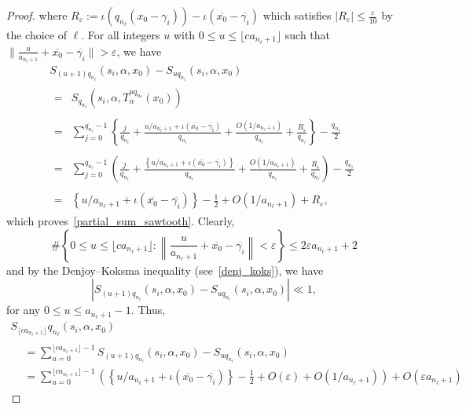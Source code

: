 \documentclass[10pt,a4paper]{amsart}
\numberwithin{equation}{section}
\newcommand{\kj}{n_{\ell}}
\theoremstyle{definition}
\begin{document}
\begin{proof}
where $ R_{\varepsilon} := \iota(q_{\kj}(x_0-\gamma_i)) - \iota(\overline{x_0}-\overline{\gamma_i})$ which satisfies $| R_{\varepsilon} | \leq \frac{\varepsilon}{10}$ by the choice of $\ell$. For all integers $u$ with $0 \leq u \leq \lfloor c a_{\kj +1} \rfloor $ such that $ \| \frac{u}{a_{\kj +1}} + \overline{x_0}-\overline{\gamma_i}\| > \varepsilon$, we have
\begin{multline*}
S_{(u+1)q_{\kj}}(s_i,\alpha,x_0) - S_{uq_{\kj}}(s_i,\alpha,x_0)
\\
\begin{aligned}
=&S_{q_{\kj}}\left(s_i, \alpha, T_{\alpha}^{u q_{\kj}}(x_0)\right) \\
\\=&\sum_{j = 0}^{q_{\kj}-1} \left\{ \frac{j}{q_{\kj}} +\frac{u/a_{\kj+1} + \iota \left(\overline{x_0} - \overline{\gamma_i}\right)}{q_{\kj}} + \frac{O(1/a_{\kj+1})}{q_{\kj}} + \frac{R_\varepsilon}{q_{\kj}}\right\} - \frac{q_{\kj}}{2} \\
\\=&\sum_{j = 0}^{q_{\kj}-1} \left(\frac{j}{q_{\kj}} +\frac{ \left \{u/a_{\kj+1} + \iota \left(\overline{x_0}- \overline{\gamma_i}\right) \right \}}{q_{\kj}} + \frac{O(1/a_{\kj+1})}{q_{\kj}} + \frac{R_\varepsilon}{q_{\kj}} \right) - \frac{q_{\kj}}{2}\\
\\=&\left\{u/a_{\kj+1} + \iota(\overline{x_0}- \overline{\gamma_i}) \right\} - \frac{1}{2} + O(1/a_{\kj+1}) + R_{\varepsilon},
\end{aligned}
\end{multline*}
which proves~\eqref{partial_sum_sawtooth}. Clearly,
\[
\#\left\{ 0 \leq u \leq \lfloor c a_{\kj+1}\rfloor:
\left\|\frac{u}{a_{\kj +1}} + \overline{x_0}- \overline{\gamma_i}\right\| < \varepsilon
\right\} \leq 2\varepsilon a_{\kj+1} + 2
\]
and by the Denjoy--Koksma inequality (see~\eqref{denj_koks}), we have
\[
| S_{(u+1)q_{\kj}}(s_i,\alpha,x_0) - S_{uq_{\kj}}(s_i,\alpha,x_0)|
\ll 1,
\]
for any $0 \leq u \leq {a_{\kj+1}-1}$. Thus,
\begin{multline*}
S_{\lfloor c a_{\kj+1}\rfloor}q_{\kj}(s_i,\alpha,x_0)
\\
\begin{aligned}
&= \sum_{u = 0}^{\lfloor c a_{\kj+1}\rfloor-1} S_{(u+1)q_{\kj}}(s_i,\alpha,x_0) - S_{uq_{\kj}}(s_i,\alpha,x_0)
\\&= \sum_{u = 0}^{\lfloor c a_{\kj+1}\rfloor-1}\left(\left\{u/a_{\kj+1} + \iota(\overline{x_0}- \overline{\gamma_i})\right\} - \frac{1}{2} + O(\varepsilon) + O\left(1/a_{\kj+1}\right)\right) + O\left(\varepsilon a_{\kj+1}\right)

\end{aligned}
\end{multline*}
\end{proof}
\end{document}
